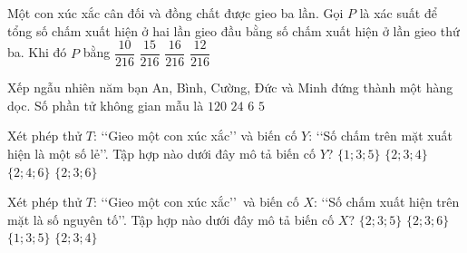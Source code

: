 \begin{ex}%
	Một con xúc xắc cân đối và đồng chất được gieo ba lần. Gọi $P$ là xác suất để tổng số chấm xuất hiện ở hai lần gieo đầu bằng số chấm xuất hiện ở lần gieo thứ ba. Khi đó $P$ bằng
	\choice
	{$\dfrac{10}{216}$}
	{\True $\dfrac{15}{216}$}
	{$\dfrac{16}{216}$}
	{$\dfrac{12}{216}$}
\end{ex}

\begin{ex}%
	Xếp ngẫu nhiên năm bạn An, Bình, Cường, Đức và Minh đứng  thành một hàng dọc. Số phần tử không gian mẫu là
	\choice
	{\True $120$}
	{$24$}
	{$6$}
	{$5$}	
\end{ex}
\begin{ex}%
	Xét phép thử $T$: \lq\lq  Gieo một con xúc xắc\rq\rq\;  và biến cố $Y$: \lq\lq  Số chấm trên mặt xuất hiện là một số lẻ\rq\rq. Tập hợp nào dưới đây mô tả biến cố $Y$?
	\choice
	{\True $\{1;3;5\}$}
	{$\{2;3;4\}$}
	{$\{2;4;6\}$}
	{$\{2;3;6\}$}	
\end{ex}
\begin{ex}%
	Xét phép thử $T$: \lq\lq  Gieo một con xúc xắc\rq\rq\
	và  biến cố $X$: \lq\lq  Số chấm xuất hiện trên mặt là số nguyên tố\rq\rq. Tập hợp nào dưới đây mô tả biến cố $X$?
	\choice
	{\True $\{2;3;5\}$}
	{$\{2;3;6\}$}
	{$\{1;3;5\}$}
	{$\{2;3;4\}$}	
\end{ex}

